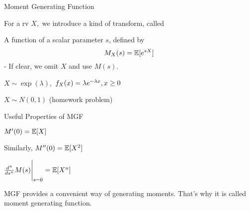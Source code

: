 \begin{frame}{Moment Generating Function}

{
\small
\plitemsep 0.1in
\bci 
\item<1-> For a rv $X,$ we introduce a kind of transform, called  

\item<2-> A function of a scalar parameter $s$, defined by
$$
M_X(s) = \mathbb{E}[ e^{sX} ]
$$
- If clear, we omit $X$ and use $M(s).$
\eci 
}
{
\small
\plitemsep 0.1in
\bci 
\item<4->[Ex1)] $X \sim \exp(\lambda),$ $f_X(x) = \lambda e^{-\lambda x}, x\ge 0$

\item<5->[Ex2)] $X \sim N(0,1)$ (homework problem)

\eci 
}

\end{frame}

\begin{frame}{Useful Properties of MGF}

\plitemsep 0.1in
\bce 
\item<1-> $M'(0) = \mathbb{E}[ X ]$

\item<3-> Similarly, $M''(0) = \mathbb{E}[ X^2 ]$

\item<4-> $\frac{d^n}{ds^n} M(s) \Bigg |_{s=0} = \mathbb{E}[ X^n ]$

\item<5-> MGF provides a convenient way of generating moments. That's why it is called moment generating function. 

\ece 


\end{frame}


